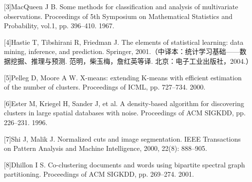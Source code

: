 \documentclass[UTF8,12pt,a4paper,fontset=fandol]{ctexart}
\begin{document}
[3]\quad MacQueen J B. Some methods for classification and analysis of multivariate observations. Proceedings of 5th Symposium on Mathematical Statistics and Probability, vol.1, pp. 396--410. 1967.

[4]\quad Hastie T, Tibshirani R, Friedman J. The elements of statistical learning: data mining, inference, and prediction. Springer, 2001.（中译本：统计学习基础——数据挖掘、推理与预测. 范明，柴玉梅，詹红英等译. 北京：电子工业出版社，2004.）

[5]\quad Pelleg D, Moore A W. X-means: extending K-means with efficient estimation of the number of clusters. Proceedings of ICML, pp. 727--734. 2000.

[6]\quad Ester M, Kriegel H, Sander J, et al. A density-based algorithm for discovering clusters in large spatial databases with noise. Proceedings of ACM SIGKDD, pp. 226--231. 1996.

[7]\quad Shi J, Malik J. Normalized cuts and image segmentation. IEEE Transactions on Pattern Analysis and Machine Intelligence, 2000, 22(8): 888--905.

[8]\quad Dhillon I S. Co-clustering documents and words using bipartite spectral graph partitioning. Proceedings of ACM SIGKDD, pp. 269--274. 2001.
\end{document}

